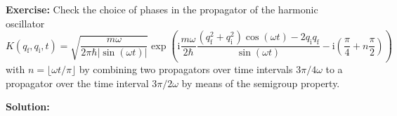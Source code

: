 \documentclass[11pt,DIV=19,parskip=half]{scrartcl}
\begin{document}
\pagestyle{empty}


\vspace{0.5truecm}
\textbf{Exercise:} Check the choice of phases in the propagator of the harmonic
oscillator
\begin{equation}
 K(q_\text{f}, q_\text{i}, t)
      = \sqrt{\frac{m\omega}{2\pi\hbar\vert{\sin(\omega t)}\vert}}
         \exp\left(\text{i}\frac{m\omega}{2\hbar}\frac{(q_\text{f}^2+q_\text{i}^2)\cos(\omega t)
         -2q_\text{i}q_\text{f}}{\sin(\omega t)}-\text{i}\left(\frac{\pi}{4}+n\frac{\pi}{2}\right)\right)
\end{equation}
with $n=\lfloor\omega t/\pi\rfloor$ by combining two propagators over time intervals
$3\pi/4\omega$ to a propagator over the time interval $3\pi/2\omega$ by means of the semigroup
property.

\vspace{0.5truecm}
\textbf{Solution:}
\end{document}
